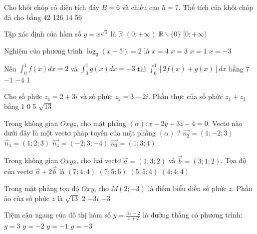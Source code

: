 \begin{ex} 
 Cho khối chóp có diện tích đáy $B=6$ và chiều cao $h=7$. Thể tích của khối chóp đã cho bằng
\choice 
 { 42 } 
 { 126 } 
 { 14} 
 { 56 }
\end{ex} 
 
\begin{ex} 
 Tập xác định của hàm số $y=x^{\sqrt{3}}$ là
\choice 
 { $\mathbb{R}$} 
 { $(0 ;+\infty)$} 
 { $\mathbb{R} \backslash\{0\}$} 
 { $[0 ;+\infty)$}
\end{ex} 
 
\begin{ex} 
 Nghiệm của phương trình $\log _{3}(x+5)=2$ là
\choice 
 { $x=4$} 
 { $x=3$} 
 { $x=1$} 
 { $x=-3$}
\end{ex} 
 
\begin{ex} 
 Nếu $\int_{0}^{1} f(x) d x=2$ và $\int_{0}^{1} g(x) d x=-3$ thì $\int_{0}^{1}[2 f(x)+g(x)] d x$ bằng
\choice 
 { 7 } 
 { $-1$} 
 { $-4$} 
 { 1 }
\end{ex} 
 
\begin{ex} 
 Cho số phức $z_{1}=2+3 i$ và số phức $z_{2}=3-2 i$. Phần thực của số phức $z_{1}+z_{2}$ bằng
\choice 
 { 1 } 
 { 0 } 
 { 5 } 
 { $\sqrt{13}$}
\end{ex} 
 
\begin{ex} 
 Trong không gian $O x y z$, cho mặt phẳng $(\alpha): x-2 y+3 z-4=0$. Vectơ nào dưới đây là một vectơ pháp tuyến của mặt phẳng $(\alpha)$ ?
\choice 
 { $\overrightarrow{n_{2}}=(1 ;-2 ; 3)$} 
 { $\vec{n}_{1}=(1 ; 2 ; 3)$} 
 { $\overrightarrow{n_{4}}=(-2 ; 3 ;-4)$} 
 { $\overrightarrow{n_{3}}=(1 ; 3 ; 4)$}
\end{ex} 
 
\begin{ex} 
 Trong không gian $O x y z$, cho hai vectơ $\vec{a}=(1 ; 3 ; 2)$ và $\vec{b}=(3 ; 1 ; 2)$. Tọa độ của vectơ $\vec{a}+2 \vec{b}$ là
\choice 
 { $(7 ; 4 ; 4)$} 
 { $(7 ; 5 ; 6)$} 
 { $(5 ; 5 ; 4)$} 
 { $(4 ; 4 ; 4)$}
\end{ex} 
 
\begin{ex} 
 Trong mặt phẳng tọa độ $O x y$, cho $M(2 ;-3)$ là điểm biểu diễn số phức $z$. Phần ảo của số phức $z$ là
\choice 
 { $\sqrt{13}$} 
 { 2 } 
 { $-3 i$} 
 { $-3$}
\end{ex} 
 
\begin{ex} 
 Tiệm cận ngang của đồ thị hàm số $y=\frac{3 x-2}{x+2}$ là đường thẳng có phương trình:
\choice 
 { $y=3$} 
 { $y=-2$} 
 { $y=-1$} 
 { $y=-3$}
\end{ex} 
 
